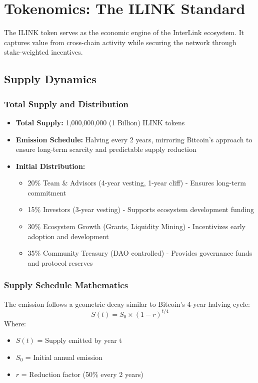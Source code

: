 \documentclass[11pt,a4paper]{article}
\begin{document}
\section{Tokenomics: The ILINK Standard}
\label{sec:tokenomics}

The ILINK token serves as the economic engine of the InterLink ecosystem. It captures value from cross-chain activity while securing the network through stake-weighted incentives.

\subsection{Supply Dynamics}

\subsubsection{Total Supply and Distribution}
\begin{itemize}
    \item \textbf{Total Supply:} 1,000,000,000 (1 Billion) ILINK tokens
    \item \textbf{Emission Schedule:} Halving every 2 years, mirroring Bitcoin's approach to ensure long-term scarcity and predictable supply reduction
    \item \textbf{Initial Distribution:}
        \begin{itemize}
            \item 20\% Team \& Advisors (4-year vesting, 1-year cliff) - Ensures long-term commitment
            \item 15\% Investors (3-year vesting) - Supports ecosystem development funding
            \item 30\% Ecosystem Growth (Grants, Liquidity Mining) - Incentivizes early adoption and development
            \item 35\% Community Treasury (DAO controlled) - Provides governance funds and protocol reserves
        \end{itemize}
\end{itemize}

\subsubsection{Supply Schedule Mathematics}
The emission follows a geometric decay similar to Bitcoin's 4-year halving cycle:
$$ S(t) = S_0 \times (1 - r)^{t/4} $$
Where:
\begin{itemize}
    \item $S(t)$ = Supply emitted by year t
    \item $S_0$ = Initial annual emission
    \item $r$ = Reduction factor (50\% every 2 years)
\end{itemize}
\end{document}
